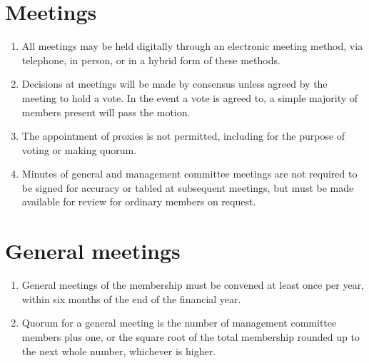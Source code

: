 \documentclass[11pt, oneside]{article}
\begin{document}
\section{Meetings}
\begin{enumerate}
\item All meetings may be held digitally through an electronic meeting method, via telephone, in person, or in a hybrid form of these methods.
\item Decisions at meetings will be made by consensus unless agreed by the meeting to hold a vote. In the event a vote is agreed to, a simple majority of members present will pass the motion. 
\item The appointment of proxies is not permitted, including for the purpose of voting or making quorum.
\item Minutes of general and management committee meetings are not required to be signed for accuracy or tabled at subsequent meetings, but must be made available for review for ordinary members on request. 
\end{enumerate}

\section{General meetings}
\begin{enumerate}
\item General meetings of the membership must be convened at least once per year, within six months of the end of the financial year. 
\item Quorum for a general meeting is the number of management committee members plus one, or the square root of the total membership rounded up to the next whole number, whichever is higher. 
\end{enumerate}
\end{document}
